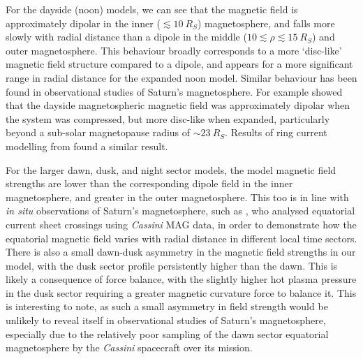 For the dayside (noon) models, we can see that the magnetic field is approximately dipolar in the inner ($\lesssim\SI{10}{R_S}$) magnetosphere, and falls more slowly with radial distance than a dipole in the middle ($10\lesssim\rho\lesssim\SI{15}{R_S}$) and outer magnetosphere. This behaviour broadly corresponds to a more `disc-like' magnetic field structure compared to a dipole, and appears for a more significant range in radial distance for the expanded noon model. Similar behaviour has been found in observational studies of Saturn's magnetosphere. For example \citet{arridge2008} showed that the dayside magnetospheric magnetic field was approximately dipolar when the system was compressed, but more disc-like when expanded, particularly beyond a sub-solar magnetopause radius of ${\sim}\SI{23}{R_S}$. Results of ring current modelling from \citet{bunce2008} found a similar result. 

For the larger dawn, dusk, and night sector models, the model magnetic field strengths are lower than the corresponding dipole field in the inner magnetosphere, and greater in the outer magnetosphere. This too is in line with \textit{in situ} observations of Saturn's magnetosphere, such as \citet{delamere2015}, who analysed equatorial current sheet crossings using \textit{Cassini} MAG data, in order to demonstrate how the equatorial magnetic field varies with radial distance in different local time sectors. There is also a small dawn-dusk asymmetry in the magnetic field strengths in our model, with the dusk sector profile persistently higher than the dawn. This is likely a consequence of force balance, with the slightly higher hot plasma pressure in the dusk sector requiring a greater magnetic curvature force to balance it. This is interesting to note, as such a small asymmetry in field strength would be unlikely to reveal itself in observational studies of Saturn's magnetosphere, especially due to the relatively poor sampling of the dawn sector equatorial magnetosphere by the \textit{Cassini} spacecraft over its mission.

